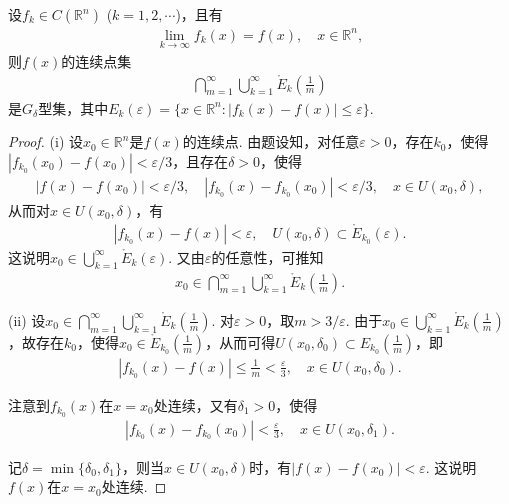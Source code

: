 \documentclass[../../main.tex]{subfiles}
\begin{document}
\begin{example}\label{example:例12}
设$f_k\in C(\mathbb{R}^n)$ ($k = 1,2,\cdots$)，且有
\begin{align*}
\lim_{k\to\infty}f_k(x)=f(x), \quad x\in\mathbb{R}^n,
\end{align*}
则$f(x)$的连续点集
\begin{align*}
\bigcap_{m = 1}^{\infty}\bigcup_{k = 1}^{\infty}\mathring{E}_k\left(\frac{1}{m}\right)
\end{align*}
是$G_{\delta}$型集，其中$E_k(\varepsilon)=\{x\in\mathbb{R}^n: |f_k(x)-f(x)|\leqslant\varepsilon\}$.
\end{example}
\begin{proof}
(i) 设$x_0\in\mathbb{R}^n$是$f(x)$的连续点. 由题设知，对任意$\varepsilon>0$，存在$k_0$，使得$|f_{k_0}(x_0)-f(x_0)|<\varepsilon/3$，且存在$\delta>0$，使得
\begin{align*}
|f(x)-f(x_0)|<\varepsilon/3, \quad |f_{k_0}(x)-f_{k_0}(x_0)|<\varepsilon/3, \quad x\in U(x_0,\delta),
\end{align*}
从而对$x\in U(x_0,\delta)$，有
\begin{align*}
|f_{k_0}(x)-f(x)|<\varepsilon, \quad U(x_0,\delta)\subset\mathring{E}_{k_0}(\varepsilon).
\end{align*}
这说明$x_0\in\bigcup_{k = 1}^{\infty}\mathring{E}_k(\varepsilon)$. 又由$\varepsilon$的任意性，可推知
\begin{align*}
x_0\in\bigcap_{m = 1}^{\infty}\bigcup_{k = 1}^{\infty}\mathring{E}_k\left(\frac{1}{m}\right).
\end{align*}

(ii) 设$x_0\in\bigcap_{m = 1}^{\infty}\bigcup_{k = 1}^{\infty}\mathring{E}_k\left(\frac{1}{m}\right)$. 对$\varepsilon>0$，取$m>3/\varepsilon$. 由于$x_0\in\bigcup_{k = 1}^{\infty}\mathring{E}_k\left(\frac{1}{m}\right)$，故存在$k_0$，使得$x_0\in\mathring{E}_{k_0}\left(\frac{1}{m}\right)$，从而可得$U(x_0,\delta_0)\subset E_{k_0}\left(\frac{1}{m}\right)$，即
\begin{align*}
|f_{k_0}(x)-f(x)|\leqslant\frac{1}{m}<\frac{\varepsilon}{3}, \quad x\in U(x_0,\delta_0).
\end{align*}

注意到$f_{k_0}(x)$在$x = x_0$处连续，又有$\delta_1>0$，使得
\begin{align*}
|f_{k_0}(x)-f_{k_0}(x_0)|<\frac{\varepsilon}{3}, \quad x\in U(x_0,\delta_1).
\end{align*}

记$\delta=\min\{\delta_0,\delta_1\}$，则当$x\in U(x_0,\delta)$时，有$|f(x)-f(x_0)|<\varepsilon$. 这说明$f(x)$在$x = x_0$处连续. 
\end{proof}
\end{document}
